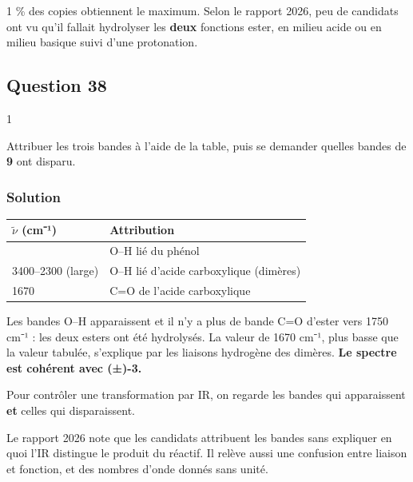 \documentclass[11pt,a4paper]{article}
\begin{document}
\begin{jury}

1 \% des copies obtiennent le maximum. Selon le rapport 2026, peu de candidats ont vu qu'il fallait hydrolyser les \textbf{deux} fonctions ester, en milieu acide ou en milieu basique suivi d'une protonation.

\end{jury}

\hypertarget{question-38}{%
\subsection{Question 38}\label{question-38}}

\begin{indication}{1}

Attribuer les trois bandes à l'aide de la table, puis se demander quelles bandes de \textbf{9} ont disparu.

\end{indication}

\hypertarget{solution-37}{%
\subsubsection{Solution}\label{solution-37}}

\begin{longtable}[]{@{}ll@{}}
\toprule\noalign{}
\(\tilde\nu\) (cm⁻¹) & Attribution \\
\midrule\noalign{}
\endhead
\bottomrule\noalign{}
\endlastfoot
3500 & O--H lié du phénol \\
3400--2300 (large) & O--H lié d'acide carboxylique (dimères) \\
1670 & C=O de l'acide carboxylique \\
\end{longtable}

Les bandes O--H apparaissent et il n'y a plus de bande C=O d'ester vers 1750 cm⁻¹ : les deux esters ont été hydrolysés. La valeur de 1670 cm⁻¹, plus basse que la valeur tabulée, s'explique par les liaisons hydrogène des dimères. \textbf{Le spectre est cohérent avec (±)-3.}

\begin{methode}

Pour contrôler une transformation par IR, on regarde les bandes qui apparaissent \textbf{et} celles qui disparaissent.

\end{methode}

\begin{jury}

Le rapport 2026 note que les candidats attribuent les bandes sans expliquer en quoi l'IR distingue le produit du réactif. Il relève aussi une confusion entre liaison et fonction, et des nombres d'onde donnés sans unité.

\end{jury}
\end{document}
